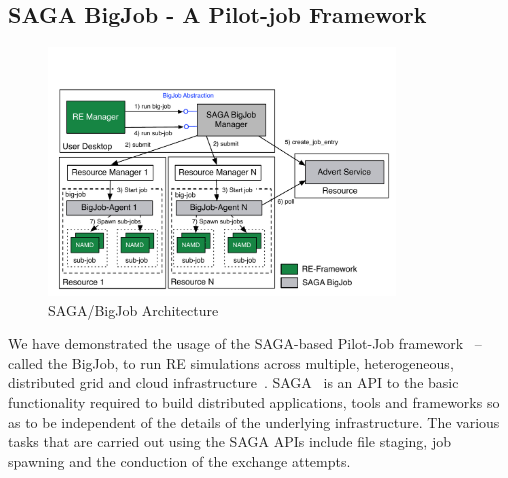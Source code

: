 \documentclass{rspublic}
\begin{document}


\subsection{SAGA BigJob - A Pilot-job Framework}
\label{sec:BigJob}


\begin{figure}[t]
      \centering
          \includegraphics[width=0.82\textwidth]{../figures/Bigjob_arch.pdf}
          \caption{\footnotesize SAGA/BigJob Architecture
              }
      \label{fig:bigjob}
\end{figure}

We have demonstrated the usage of the SAGA-based Pilot-Job
framework~\citep{saga_bigjob_condor_cloud} -- called the BigJob, to
run RE simulations across multiple, heterogeneous, distributed grid
and cloud infrastructure~\citep{Luckow:2008fp}.  SAGA~\citep{saga-url}
is an API to the basic functionality required to build distributed
applications, tools and frameworks so as to be independent of the
details of the underlying infrastructure.  The various tasks that are
carried out using the SAGA APIs include file staging, job spawning and
the conduction of the exchange attempts.
\end{document}
